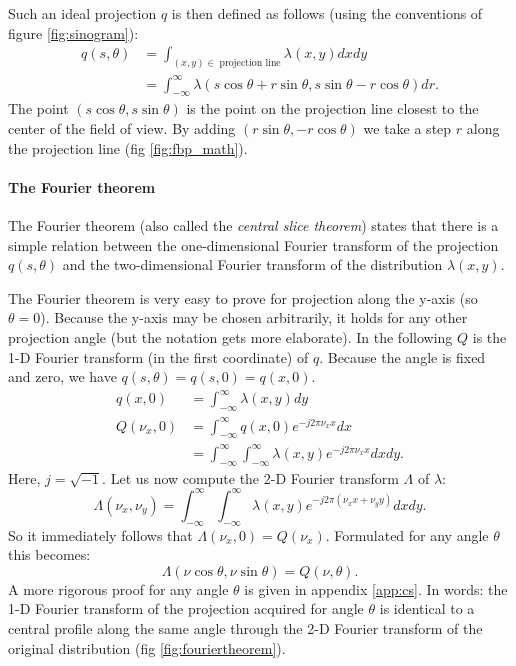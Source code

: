 \documentclass[11pt,oneside]{article}
\begin{document}
Such an ideal projection $q$ is then defined as follows (using the conventions
of figure \ref{fig:sinogram}):
\begin{align}
q(s, \theta) &= \int_{(x,y) \in \; \mbox{projection line}}
                  \lambda(x,y) dx dy\\
             &= \int_{-\infty}^{\infty}
        \lambda(s \cos \theta + r \sin \theta,
                s \sin \theta - r \cos \theta) dr. \label{eq:jnidealproj}
\end{align}
The point $(s \cos \theta, s \sin \theta)$ is the point on the projection line
closest to the center of the field of view.  By adding $(r \sin \theta, - r
\cos \theta)$ we take a step $r$ along the projection line (fig
\ref{fig:fbp_math}).


\paragraph{The Fourier theorem}
The Fourier theorem (also called the {\em central slice theorem})
states that there is a simple relation between the one-dimensional
Fourier transform of the projection $q(s, \theta)$ and the
two-dimensional Fourier transform of the distribution $\lambda(x,y)$.

The Fourier theorem is very easy to prove for projection along the y-axis (so
$\theta = 0$). Because the y-axis may be chosen arbitrarily, it holds for
any other projection angle (but the notation gets more elaborate).
In the following $Q$ is the 1-D Fourier transform (in the first coordinate) of
$q$. Because the angle is fixed and zero, we have
$q(s, \theta) = q(s, 0) = q(x,0)$.
\begin{align}
  q(x,0) &= \int_{-\infty}^{\infty} \lambda(x,y) dy \\
  Q(\nu_x,0) &= \int_{-\infty}^{\infty}  q(x,0) e^{-j2\pi \nu_x x} dx \\
          &= \int_{-\infty}^{\infty}  \int_{-\infty}^{\infty}
                 \lambda(x,y) e^{-j2\pi \nu_x x} dx dy.
\end{align}
Here, $j = \sqrt{-1}$. Let us now compute the 2-D Fourier transform
$\Lambda$ of $\lambda$:
\begin{equation}
\Lambda(\nu_x, \nu_y)  =   \int_{-\infty}^{\infty}  \int_{-\infty}^{\infty}
         \lambda(x,y) e^{-j2\pi (\nu_x x + \nu_y y)} dx dy.
\end{equation}
So it immediately follows that $\Lambda(\nu_x, 0) = Q(\nu_x)$.
Formulated for any angle $\theta$ this becomes:
\begin{equation}
  \Lambda(\nu \cos \theta, \nu \sin \theta) = Q(\nu, \theta). 
  \label{fouriertheorem}
\end{equation}
A more rigorous proof for any angle $\theta$ is given in appendix
\ref{app:cs}.  In words: the 1-D Fourier transform of the projection
acquired for angle $\theta$ is identical to a central profile along
the same angle through the 2-D Fourier transform of the original
distribution (fig \ref{fig:fouriertheorem}).
\end{document}

